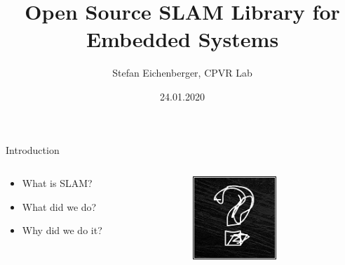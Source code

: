 \documentclass[aspectratio=169]{beamer}
\begin{document}
\obeylines

\title[Open Source SLAM Library for Embedded Systems]{Open Source SLAM Library for Embedded Systems}
\author{Stefan Eichenberger, CPVR Lab}
\date{24.01.2020}

\begin{frame}
  \titlepage\thispagestyle{empty}
\end{frame}

\begin{frame}{Introduction}
  \begin{columns}[c]
    \begin{column}{0.4\linewidth}
      \begin{itemize}
        \item What is SLAM?
        \item What did we do?
        \item Why did we do it?
      \end{itemize}
    \end{column}
    \begin{column}{0.4\linewidth}
      \begin{center}
        \includegraphics[width=0.5\textwidth]{./img/questionmark.jpg}
      \end{center}
    \end{column}
  \end{columns}
\end{frame}
\end{document}
